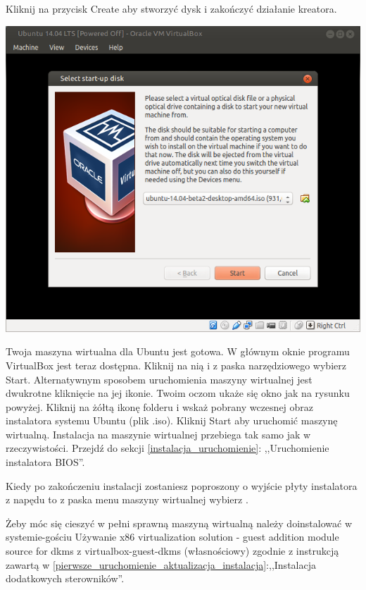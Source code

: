 Kliknij na przycisk \textcolor{ubuntu_orange}{Create} aby stworzyć dysk i zakończyć działanie kreatora.

\clearpage
\begin{center}
	\includegraphics[width=\linewidth]{images/virtualbox_start.png}
\end{center}

Twoja maszyna wirtualna dla Ubuntu jest gotowa. W głównym oknie programu VirtualBox jest teraz dostępna. Kliknij na nią i z paska narzędziowego wybierz \textcolor{ubuntu_orange}{Start}. Alternatywnym sposobem uruchomienia maszyny wirtualnej jest dwukrotne kliknięcie na jej ikonie. Twoim oczom ukaże się okno jak na rysunku powyżej. Kliknij na żółtą ikonę folderu i wskaż pobrany wczesnej obraz instalatora systemu Ubuntu (plik .iso). Kliknij \textcolor{ubuntu_orange}{Start} aby uruchomić maszynę wirtualną. Instalacja na maszynie wirtualnej przebiega tak samo jak w rzeczywistości. Przejdź do sekcji \ref{instalacja_uruchomienie}: ,,Uruchomienie instalatora BIOS''.

Kiedy po zakończeniu instalacji zostaniesz poproszony o wyjście płyty instalatora z napędu to z paska menu maszyny wirtualnej wybierz .

Żeby móc się cieszyć w pełni sprawną maszyną wirtualną należy doinstalować w systemie-gościu \textcolor{ubuntu_orange}{Używanie x86 virtualization solution - guest addition module source for dkms z virtualbox-guest-dkms (własnościowy)} zgodnie z instrukcją zawartą w \ref{pierwsze_uruchomienie_aktualizacja_instalacja}:,,Instalacja dodatkowych sterowników''.
\clearpage
